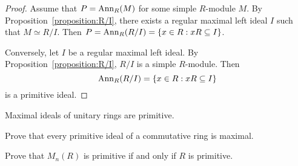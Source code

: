 \begin{proof}
	Assume that $P=\operatorname{Ann}_R(M)$ for some simple $R$-module $M$. By
	Proposition~\ref{proposition:R/I}, there exists a regular maximal 
	left ideal 
	$I$ such that $M\simeq R/I$. Then $P=\operatorname{Ann}_R(R/I)=\{x\in
	R:xR\subseteq I\}$. 

	Conversely, let $I$ be a regular maximal left ideal. By
	Proposition~\ref{proposition:R/I}, $R/I$ is a simple $R$-module. Then
	\[
	\operatorname{Ann}_R(R/I)=\{x\in R:xR\subseteq I\}
	\]
	is a primitive ideal.
\end{proof}


\begin{exercise}
\label{xca:maximal=>primitive}
    Maximal ideals of unitary rings are primitive.  
\end{exercise}

\begin{exercise}
\label{xca:primitive=>maximal}
	Prove that every primitive ideal of a commutative ring is maximal.
\end{exercise}

\begin{exercise}
\label{xca:M_n(R)primitive}
    Prove that $M_n(R)$ is primitive if and only if $R$ is primitive.
\end{exercise}

